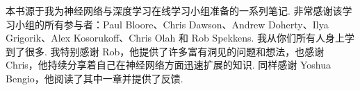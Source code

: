 本书源于我为神经网络与深度学习在线学习小组准备的一系列笔记. 非常感谢该学习小组的所有参与者：Paul Bloore、Chris Dawson、Andrew Doherty、Ilya Grigorik、Alex Kosorukoff、Chris Olah 和 Rob Spekkens. 我从你们所有人身上学到了很多. 我特别感谢 Rob，他提供了许多富有洞见的问题和想法，也感谢 Chris，他持续分享着自己在神经网络方面迅速扩展的知识. 同样感谢 Yoshua Bengio，他阅读了其中一章并提供了反馈.
